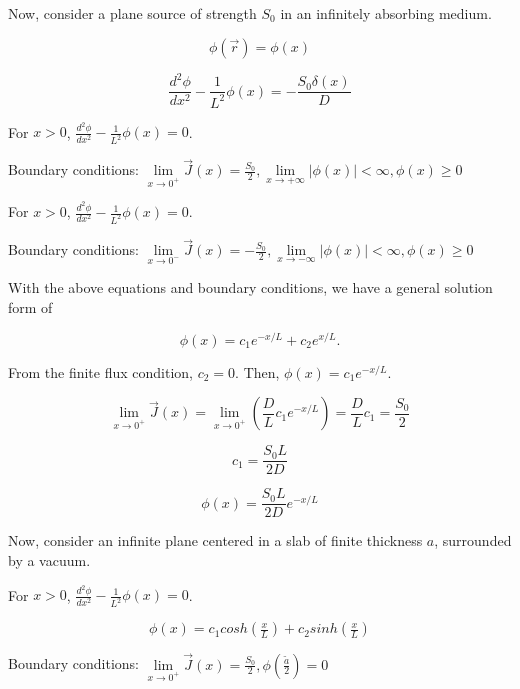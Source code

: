 \documentclass[12pt]{article}
\newcommand{\rvec}{\ensuremath{\vec{r}}}
\begin{document}
Now, consider a plane source of strength $S_0$ in an infinitely absorbing medium.

\begin{equation*}
\phi(\rvec) = \phi(x)
\end{equation*}

\begin{equation*}
\frac{d^2\phi}{dx^2} - \frac{1}{L^2}\phi(x) = -\frac{S_0\delta(x)}{D}
\end{equation*}

For $x > 0$, $\frac{d^2\phi}{dx^2} - \frac{1}{L^2}\phi(x) = 0$.


Boundary conditions: 
$\lim\limits_{x\rightarrow 0^+}\vec{J}(x) = \frac{S_0}{2}, \lim\limits_{x\rightarrow +\infty}|\phi(x)|<\infty, \phi(x) \geq 0$

For $x > 0$, $\frac{d^2\phi}{dx^2} - \frac{1}{L^2}\phi(x) = 0$.


Boundary conditions: 
$\lim\limits_{x\rightarrow 0^-}\vec{J}(x) = -\frac{S_0}{2}, \lim\limits_{x\rightarrow -\infty}|\phi(x)|<\infty, \phi(x) \geq 0$

With the above equations and boundary conditions, we have a general solution form of

\begin{equation*}
\phi(x) = c_1e^{-x/L} + c_2e^{x/L}.
\end{equation*}

From the finite flux condition, $c_2 = 0$. Then, $\phi(x) = c_1e^{-x/L}$.

\begin{equation*}
\lim\limits_{x\to 0^+} \vec{J}(x) = \lim\limits_{x\to 0^+}\left(\frac{D}{L}c_1e^{-x/L}\right) = 
\frac{D}{L}c_1 = \frac{S_0}{2}
\end{equation*}

\begin{equation*}
c_1 = \frac{S_0 L}{2D}
\end{equation*}

\begin{equation*}
\phi(x) = \frac{S_0L}{2D}e^{-x/L}
\end{equation*}

Now, consider an infinite plane centered in a slab of finite thickness $a$, surrounded by a vacuum.


For $x > 0$, $\frac{d^2\phi}{dx^2} - \frac{1}{L^2}\phi(x) = 0$.

\begin{equation*}
\phi(x) = c_1cosh(\tfrac{x}{L}) + c_2sinh(\tfrac{x}{L})
\end{equation*}

Boundary conditions: 
$\lim\limits_{x\rightarrow 0^+}\vec{J}(x) = \frac{S_0}{2}, \phi(\tfrac{\tilde{a}}{2}) = 0$
\end{document}
